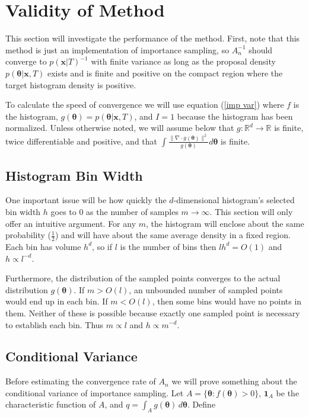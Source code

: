 \documentclass[letterpaper,12pt]{article}
\newcommand{\bx}{\boldsymbol x}
\newcommand{\btheta}{\boldsymbol \theta}
\newcommand{\norm}[1]{\lVert#1\rVert}
\begin{document}
\section{Validity of Method}

This section will investigate the performance of the method.  First,
note that this method is just an implementation of importance
sampling, so $A_n^{-1}$ should converge to $p(\bx|T)^{-1}$ with finite
variance as long as the proposal density $p(\btheta|\bx, T)$ exists
and is finite and positive on the compact region where the target
histogram density is positive.

To calculate the speed of convergence we will use equation (\ref{imp
  var}) where $f$ is the histogram, $g(\btheta) = p(\btheta|\bx, T)$,
and $I = 1$ because the histogram has been normalized.  Unless
otherwise noted, we will assume below that $g: \mathbb{R}^d
\rightarrow \mathbb{R}$ is finite, twice differentiable and positive,
and that $\int \frac{\norm{\nabla \cdot g(\btheta)}^2}{g(\btheta)}
d\btheta$ is finite.


\subsection{Histogram Bin Width}

One important issue will be how quickly the $d$-dimensional
histogram's selected bin width $h$ goes to 0 as the number of samples
$m \rightarrow \infty$.  This section will only offer an intuitive
argument.  For any $m$, the histogram will enclose about the same
probability ($\frac{1}{2}$) and will have about the same average
density in a fixed region.  Each bin has volume $h^d$, so if $l$ is
the number of bins then $lh^d = O(1)$ and $h \propto l^{-d}$.

Furthermore, the distribution of the sampled points converges to the
actual distribution $g(\btheta)$.  If $m > O(l)$, an unbounded number
of sampled points would end up in each bin.  If $m < O(l)$, then some
bins would have no points in them.  Neither of these is possible
because exactly one sampled point is necessary to establish each bin.
Thus $m \propto l$ and  $h \propto m^{-d}$.

\subsection{Conditional Variance}

Before estimating the convergence rate of $A_n$ we will prove
something about the conditional variance of importance sampling.  Let
$A = \{\btheta: f(\btheta) > 0\}$, $\mathbf{1}_A$ be the characteristic
function of $A$, and $q = \int_A g(\btheta) \,d\btheta$.  Define
\end{document}
